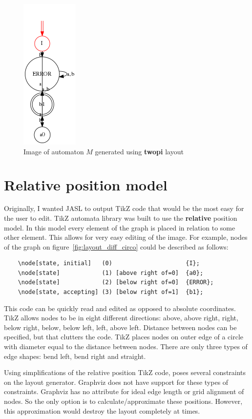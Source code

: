 \documentclass{ctuthesis}
\begin{document}
\begin{figure}[H]
\includegraphics[width=0.2\linewidth]{figures/layouts_twopi.png}
\caption{Image of automaton $M$ generated using \textbf{twopi} layout}
\label{fig:layout_diff_twopi}
\end{figure}

\section{Relative position model}
\label{sec:relpos}
Originally, I wanted JASL to output TikZ code that would be the most easy for the user to edit. TikZ automata library was built to use the \textbf{relative} position model. In this model every element of the graph is placed in relation to some other element. This allows for very easy editing of the image. For example, nodes of the graph on figure~\ref{fig:layout_diff_circo} could be described as follows:

\begin{verbatim}
	\node[state, initial] 	(0) 					{I};
	\node[state] 			(1) [above right of=0] 	{a0};
	\node[state] 			(2) [below right of=0] 	{ERROR};
	\node[state, accepting] (3) [below right of=1] 	{b1};
\end{verbatim}

This code can be quickly read and edited as opposed to absolute coordinates. TikZ allows nodes to be in eight different directions: above, above right, right, below right, below, below left, left, above left. Distance between nodes can be specified, but that clutters the code. TikZ places nodes on outer edge of a circle with diameter equal to the distance between nodes. There are only three types of edge shapes: bend left, bend right and straight. 

Using simplifications of the relative position TikZ code, poses several constraints on the layout generator. Graphviz does not have support for these types of constraints. Graphviz has no attribute for ideal edge length or grid alignment of nodes. So the only option is to calculate/approximate these positions. However, this approximation would destroy the layout completely at times. 
\end{document}
